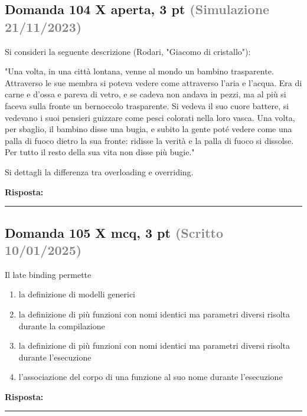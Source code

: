 \documentclass[a4paper,11pt]{article}
\begin{document}
\subsection*{Domanda 104 X \hfill {\small aperta, 3 pt \textcolor{gray}{(Simulazione 21/11/2023)}}}
\begin{tcolorbox}[colback=gray!8,colframe=gray!50,title=Contesto]
Si consideri la seguente descrizione (Rodari, "Giacomo di cristallo"):

"Una volta, in una città lontana, venne al mondo un bambino trasparente. Attraverso le sue membra si poteva vedere come attraverso l'aria e l'acqua. Era di carne e d'ossa e pareva di vetro, e se cadeva non andava in pezzi, ma al più si faceva sulla fronte un bernoccolo trasparente. Si vedeva il suo cuore battere, si vedevano i suoi pensieri guizzare come pesci colorati nella loro vasca. Una volta, per sbaglio, il bambino disse una bugia, e subito la gente poté vedere come una palla di fuoco dietro la sua fronte: ridisse la verità e la palla di fuoco si dissolse. Per tutto il resto della sua vita non disse più bugie."
\end{tcolorbox}
Si dettagli la differenza tra overloading e overriding.

\vspace{0.2cm}
\noindent\textbf{Risposta:}\par
\vspace{4cm}\hrule


\subsection*{Domanda 105 X \hfill {\small mcq, 3 pt \textcolor{gray}{(Scritto 10/01/2025)}}}
Il late binding permette

\begin{enumerate}[label=\alph*)]
\item la definizione di modelli generici
\item la definizione di più funzioni con nomi identici ma parametri diversi risolta durante la compilazione
\item la definizione di più funzioni con nomi identici ma parametri diversi risolta durante l'esecuzione
\item l'associazione del corpo di una funzione al suo nome durante l'esecuzione
\end{enumerate}
\vspace{0.2cm}
\noindent\textbf{Risposta:}\par
\vspace{1.5cm}\hrule
\end{document}
